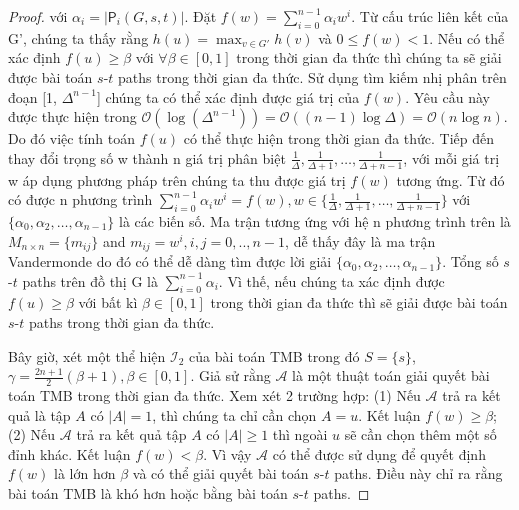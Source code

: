 \begin{proof}
	với $\alpha_i=|\mathsf{P}_i(G, s, t)|$. Đặt $f(w)=\sum_{i=0}^{n-1}\alpha_i w^i$. Từ cấu trúc liên kết của G', chúng ta thấy rằng $h(u)=\max_{v \in G'}h(v)$ và $0 \leq  f(w) < 1$. Nếu có thể xác định $f(u) \geq \beta$ với $\forall \beta \in [0, 1]$ trong thời gian đa thức thì chúng ta sẽ giải được bài toán $s$-$t$ paths trong thời gian đa thức. Sử dụng tìm kiếm nhị phân trên đoạn [1, $\Delta^{n-1}$] chúng ta có thể xác định được giá trị của $f(w)$. Yêu cầu này được thực hiện trong $\mathcal{O}(\log(\Delta^{n-1}))=\mathcal{O}((n-1)\log\Delta) =\mathcal{O}(n\log n)$. Do đó việc tính toán $f(u)$ có thể thực hiện trong thời gian đa thức. Tiếp đến thay đổi trọng số w thành n giá trị phân biệt $\frac{1}{\Delta}, \frac{1}{\Delta+1}, \ldots, \frac{1}{\Delta+n-1}$, với mỗi giá trị w áp dụng phương pháp trên chúng ta thu được giá trị $f(w)$ tương ứng. Từ đó có được n phương trình $\sum_{i=0}^{n-1}\alpha_i w^i =f(w), w \in \{\frac{1}{\Delta}, \frac{1}{\Delta+1}, \ldots, \frac{1}{\Delta+n-1} \}$ với $\{\alpha_0, \alpha_2, \ldots, \alpha_{n-1}\}$ là các biến số. Ma trận tương ứng với hệ n phương trình trên là $M_{n \times n}=\{m_{ij}\}$ and $m_{ij}=w^{i} , i,j=0,..,n-1$, dễ thấy đây là ma trận Vandermonde do đó có thể dễ dàng tìm được lời giải $\{\alpha_0, \alpha_2, \ldots, \alpha_{n-1}\}$. Tổng số $s$-$t$ paths trên đồ thị G là $\sum_{i=0}^{n-1} \alpha_i$. Vì thế, nếu chúng ta xác định được $f(u) \geq \beta$ với bất kì $\beta \in [0, 1]$ trong thời gian đa thức thì sẽ giải được bài toán $s$-$t$ paths trong thời gian đa thức. 
	
	Bây giờ, xét một thể hiện $\mathcal{I}_2$ của bài toán TMB trong đó $S=\{s\}$, $\gamma = \frac{2n+1}{2}(\beta+ 1) , \beta \in [0, 1]$.  Giả sử rằng $\mathcal{A}$ là một thuật toán giải quyết bài toán TMB trong thời gian đa thức. Xem xét 2 trường hợp: (1) Nếu $\mathcal{A}$ trả ra kết quả là tập $A$ có $|A|=1$, thì chúng ta chỉ cần chọn $A={u}$. Kết luận $f(w) \geq \beta$; (2) Nếu $\mathcal{A}$ trả ra kết quả tập $A$ có $|A| \ge 1$ thì ngoài $u$ sẽ cần chọn thêm một số đỉnh khác. Kết luận $f(w) < \beta$. Vì vậy $\mathcal{A}$ có thể được sử dụng để quyết định $f(w)$ là lớn hơn $\beta$ và có thể giải quyết bài toán $s$-$t$ paths. Điều này chỉ ra rằng bài toán TMB là khó hơn hoặc bằng bài toán $s$-$t$ paths.
\end{proof}
